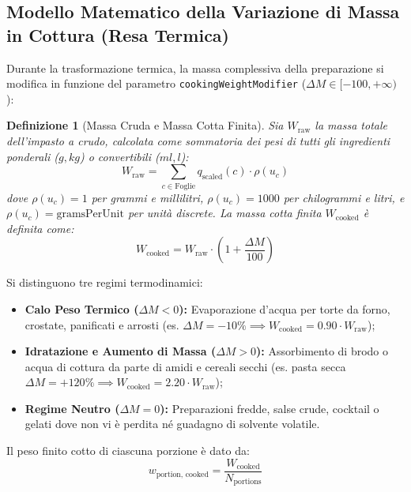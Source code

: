 \documentclass[11pt,a4paper,titlepage]{article}
\newtheorem{definition}{Definizione}
\begin{document}
\subsection{Modello Matematico della Variazione di Massa in Cottura (Resa Termica)}
Durante la trasformazione termica, la massa complessiva della preparazione si modifica in funzione del parametro \texttt{cookingWeightModifier} ($\Delta M \in [-100, +\infty)\,$):
\begin{definition}[Massa Cruda e Massa Cotta Finita]
Sia $W_{\text{raw}}$ la massa totale dell'impasto a crudo, calcolata come sommatoria dei pesi di tutti gli ingredienti ponderali ($g, kg$) o convertibili ($ml, l$):
$$W_{\text{raw}} = \sum_{c \in \text{Foglie}} q_{\text{scaled}}(c) \cdot \rho(u_c)$$
dove $\rho(u_c) = 1$ per grammi e millilitri, $\rho(u_c) = 1000$ per chilogrammi e litri, e $\rho(u_c) = \text{gramsPerUnit}$ per unit\`a discrete.
La massa cotta finita $W_{\text{cooked}}$ \`e definita come:
$$W_{\text{cooked}} = W_{\text{raw}} \cdot \left(1 + \frac{\Delta M}{100}\right)$$
\end{definition}

Si distinguono tre regimi termodinamici:
\begin{itemize}[leftmargin=*]
    \item \textbf{Calo Peso Termico ($\Delta M < 0$):} Evaporazione d'acqua per torte da forno, crostate, panificati e arrosti (es. $\Delta M = -10\% \implies W_{\text{cooked}} = 0.90 \cdot W_{\text{raw}}$);
    \item \textbf{Idratazione e Aumento di Massa ($\Delta M > 0$):} Assorbimento di brodo o acqua di cottura da parte di amidi e cereali secchi (es. pasta secca $\Delta M = +120\% \implies W_{\text{cooked}} = 2.20 \cdot W_{\text{raw}}$);
    \item \textbf{Regime Neutro ($\Delta M = 0$):} Preparazioni fredde, salse crude, cocktail o gelati dove non vi \`e perdita n\'e guadagno di solvente volatile.
\end{itemize}

Il peso finito cotto di ciascuna porzione \`e dato da:
$$w_{\text{portion, cooked}} = \frac{W_{\text{cooked}}}{N_{\text{portions}}}$$
\end{document}
